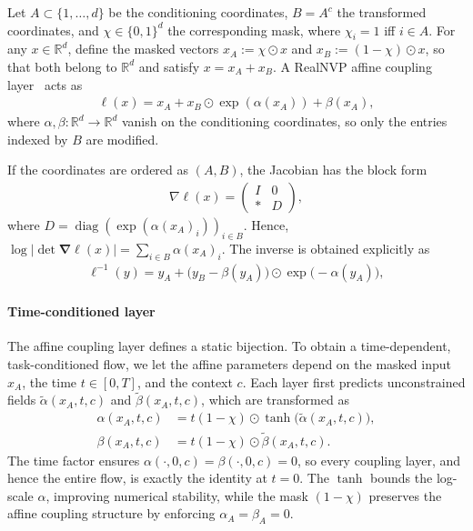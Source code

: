 \documentclass[preprint]{elsarticle}
\newcommand{\R}{\mathbb{R}}
\begin{document}
Let $A\subset\{1,\ldots,d\}$ be the conditioning coordinates,
$B=A^c$ the transformed coordinates, and
$\chi\in\{0,1\}^d$ the corresponding mask, where
$\chi_i=1$ iff $i\in A$. For any $x\in\R^d$, define the masked vectors $x_A:=\chi\odot x$ and $x_B:=(1-\chi)\odot x$, so that both belong to $\R^d$ and satisfy
$x=x_A+x_B$. A RealNVP affine coupling layer~\cite{dinh2017realnvp}
acts as
\begin{align}
\ell(x)=x_A+x_B\odot\exp(\alpha(x_A))+\beta(x_A),
\label{equ:coupling}
\end{align}
where $\alpha,\beta:\R^d\to\R^d$ vanish on the conditioning coordinates, so only the entries indexed by $B$ are modified.

If the coordinates are ordered as $(A,B)$, the Jacobian has the block form
\begin{align}
\nabla\ell(x) = \begin{pmatrix}
I & 0\\
* & D
\end{pmatrix},
\label{equ:coupling_jac}
\end{align}
where $D=\operatorname{diag}\!\left(
\exp(\alpha(x_A)_i)
\right)_{i\in B}$. Hence, $\log \bigl|\det \boldsymbol{\nabla}\ell(x)\bigr|=\sum_{i\in B} \alpha(x_A)_i$. The inverse is obtained explicitly as
\begin{align}
\ell^{-1}(y)
=
y_A
+
\bigl(y_B-\beta(y_A)\bigr)
\odot
\exp\bigl(-\alpha(y_A)\bigr),
\label{equ:coupling_inv}
\end{align}

\paragraph{Time-conditioned layer} 
The affine coupling layer defines a static bijection. To obtain a time-dependent, task-conditioned flow, we let the affine parameters depend on the masked input $x_A$, the time $t\in[0,T]$, and the context $c$. Each layer first predicts unconstrained fields $\tilde\alpha(x_A,t,c)$ and $\tilde\beta(x_A,t,c)$, which are transformed as
\begin{align}
    \alpha(x_A,t,c)
    &=t(1-\chi)\odot\tanh\bigl(\tilde\alpha(x_A,t,c)\bigr),
    \label{equ:alpha_scaled}\\
    \beta(x_A,t,c)
    &=t(1-\chi)\odot\tilde\beta(x_A,t,c).
    \label{equ:beta_scaled}
\end{align}
The time factor ensures $\alpha(\cdot,0,c)=\beta(\cdot,0,c)=0$, so every coupling layer, and hence the entire flow, is exactly the identity at $t=0$. The $\tanh$ bounds the log-scale $\alpha$, improving numerical stability, while the mask $(1-\chi)$ preserves the affine coupling structure by enforcing $\alpha_A=\beta_A=0$.
\end{document}
